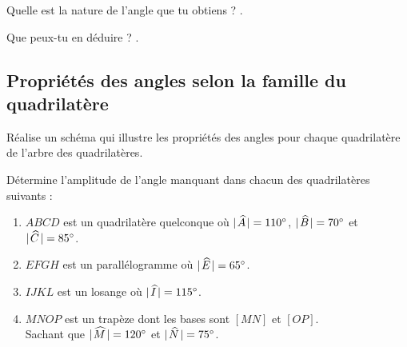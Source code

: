 \documentclass[../../syllabus_1.tex]{subfiles}
\begin{document}
Quelle est la nature de l'angle que tu
obtiens ? \dotfill.

Que peux-tu en déduire ? \dotfill.

\begin{tcolorbox}[title=Somme des amplitudes des angles d'un quadrilatère]
\end{tcolorbox}

\subsection{Propriétés des angles selon la famille du quadrilatère}
Réalise un schéma qui illustre les propriétés des angles pour chaque
quadrilatère de l'arbre des quadrilatères.

\newpage

\begin{exercise}
    Détermine l'amplitude de l'angle manquant dans chacun des quadrilatères suivants :
    \begin{enumerate}[itemsep=2cm]
        \item $ABCD$ est un quadrilatère quelconque où $\lvert\mkern2mu\widehat{A}\mkern2mu\rvert = \ang{110}$, $\lvert\mkern2mu\widehat{B}\mkern2mu\rvert = \ang{70}$ et $\lvert\mkern2mu\widehat{C}\mkern2mu\rvert = \ang{85}$. 
        
        \item $EFGH$ est un parallélogramme où $\lvert\mkern2mu\widehat{E}\mkern2mu\rvert = \ang{65}$.
        
        \item $IJKL$ est un losange où $\lvert\mkern2mu\widehat{I}\mkern2mu\rvert = \ang{115}$. 
        
        \item $MNOP$ est un trapèze dont les bases sont $[MN]$ et $[OP]$.\\Sachant que $\lvert\mkern2mu\widehat{M}\mkern2mu\rvert = \ang{120}$ et $\lvert\mkern2mu\widehat{N}\mkern2mu\rvert = \ang{75}$.
    \end{enumerate}
\end{exercise}

\vspace{1cm}
\end{document}
